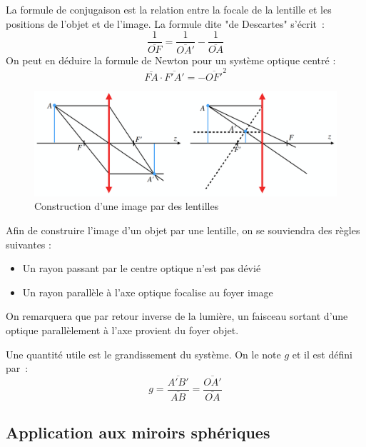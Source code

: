 \documentclass[a4paper]{book}
\begin{document}
La formule de conjugaison est la relation entre la focale de la lentille et les positions de l'objet et de l'image. La formule dite "de Descartes" s'écrit~:
\begin{equation}
\label{eq:descartes}
\frac{1}{\overline{OF}}=\frac{1}{\overline{OA'}}-\frac{1}{\overline{OA}}
\end{equation}
On peut en déduire la formule de Newton pour un système optique centré : 
\begin{equation}
\label{eq:newton}
\overline{FA}\cdot\overline{F'A'}=-\overline{OF'}^2
\end{equation}

\begin{figure}[!htbp]
\label{fig:image_lentille_convergente}
\begin{center}
\includegraphics[width=15cm]{pictures/imageConstruction.png}
\end{center}
\caption{Construction d'une image par des lentilles}
\end{figure}

Afin de construire l'image d'un objet par une lentille, on se souviendra des règles suivantes : 
\begin{itemize}
    \item Un rayon passant par le centre optique n'est pas dévié
    \item Un rayon parallèle à l'axe optique focalise au foyer image
\end{itemize}
On remarquera que par retour inverse de la lumière, un faisceau sortant d'une optique parallèlement à l'axe provient du foyer objet.


Une quantité utile est le grandissement du système. On le note $g$ et il est défini par~:
\begin{equation}
\label{eq:grandissement}
g=\frac{\overline{A'B'}}{\overline{AB}}=\frac{\overline{OA'}}{\overline{OA}}
\end{equation}

\subsection{Application aux miroirs sphériques}
\end{document}
